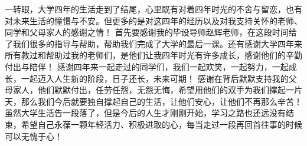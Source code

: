 \begin{thanksfor}
一转眼，大学四年的生活走到了结尾，心里既有对着四年时光的不舍与留恋，也有对未来生活的憧憬与不安。但更多的是对这四年的经历以及对我支持关怀的老师、同学和父母家人的感谢之情！
       首先要感谢我的毕设导师赵辉老师，在这段时间给了我们很多的指导与帮助，帮助我们完成了大学的最后一课。还有感谢大学四年来所有教过和帮助过我的老师们，是他们让我四年时光有许多成长，感谢他们的辛勤付出与陪伴！
       感谢四年来一起走过的同学们，我们一起欢笑，一起努力，一起成长，一起迈入人生新的阶段，日子还长，未来可期！
       感谢在背后默默支持我的父母家人，他们默默付出，任劳任怨，无怨无悔，希望用他们的双手为我们撑起一片天，那么我们今后就要独自撑起自己的生活，让他们安心，让他们不再那么辛苦！
       虽然大学生活告一段落了，但是今后的人生才刚刚开始，学习之路也还远没有结束，希望自己永葆一颗年轻活力、积极进取的心，每当走过一段再回首往事的时候可以无愧于心！
\end{thanksfor}